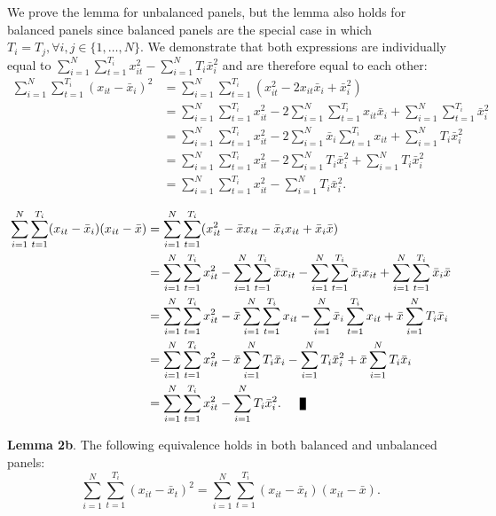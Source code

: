 \documentclass{article}[12pt]
\newenvironment{proof}[1][Proof.]{\begin{trivlist}
\item[\hskip \labelsep {\bfseries #1}]}{\end{trivlist}}
\newcommand{\qed}{\nobreak \ifvmode \relax \else
      \ifdim\lastskip<1.5em \hskip-\lastskip
      \hskip1.5em plus0em minus0.5em \fi \nobreak
      \vrule height0.75em width0.5em depth0.25em\fi}
\begin{document}
\begin{proof}
We prove the lemma for unbalanced panels, but the lemma also holds for balanced panels since balanced panels are the special case in which $T_i = T_j, \forall i, j \in \{1, \hdots, N\}$. We demonstrate that both expressions are individually equal to $\sum_{i=1}^N \sum_{t=1}^{T_i}x_{it}^2  -  \sum_{i=1}^N T_i\bar{x}_i^2$ and are therefore equal to each other:
\begin{align}
\sum_{i=1}^N \sum_{t=1}^{T_i}(x_{it}  - \bar{x}_i)^2 & = \sum_{i=1}^N \sum_{t=1}^{T_i}(x_{it}^2  - 2x_{it}\bar{x}_i + \bar{x}_i^2)\nonumber\\ 
& = \sum_{i=1}^N \sum_{t=1}^{T_i}x_{it}^2  - 2\sum_{i=1}^N \sum_{t=1}^{T_i}x_{it}\bar{x}_i + \sum_{i=1}^N \sum_{t=1}^{T_i}\bar{x}_i^2\nonumber\\ 
& = \sum_{i=1}^N \sum_{t=1}^{T_i}x_{it}^2  - 2\sum_{i=1}^N \bar{x}_i \sum_{t=1}^{T_i}x_{it}+ \sum_{i=1}^N T_i\bar{x}_i^2\nonumber\\ 
& = \sum_{i=1}^N \sum_{t=1}^{T_i}x_{it}^2  - 2\sum_{i=1}^N T_i\bar{x}_{i}^2+ \sum_{i=1}^N T_i\bar{x}_i^2\nonumber\\ 
& = \sum_{i=1}^N \sum_{t=1}^{T_i}x_{it}^2  -  \sum_{i=1}^N T_i\bar{x}_i^2.
\end{align}

\begin{align}
\sum_{i=1}^N \sum_{t=1}^{T_i}(x_{it}  - \bar{x}_i)(x_{it}  - \bar{x}) & = \sum_{i=1}^N \sum_{t=1}^{T_i}(x_{it}^2  -\bar{x}x_{it} - \bar{x}_ix_{it} + \bar{x}_i\bar{x})\nonumber\\ 
& = \sum_{i=1}^N \sum_{t=1}^{T_i} x_{it}^2  - \sum_{i=1}^N \sum_{t=1}^{T_i}\bar{x}x_{it} -  \sum_{i=1}^N \sum_{t=1}^{T_i}\bar{x}_ix_{it} +  \sum_{i=1}^N \sum_{t=1}^{T_i}\bar{x}_i\bar{x}\nonumber\\ 
& = \sum_{i=1}^N \sum_{t=1}^{T_i} x_{it}^2  - \bar{x}\sum_{i=1}^N \sum_{t=1}^{T_i}x_{it} -  \sum_{i=1}^N \bar{x}_i\sum_{t=1}^{T_i}x_{it} +  \bar{x}\sum_{i=1}^N T_i\bar{x}_i\nonumber\\ 
& = \sum_{i=1}^N \sum_{t=1}^{T_i} x_{it}^2  - \bar{x}\sum_{i=1}^N T_i\bar{x}_{i} -  \sum_{i=1}^N T_i\bar{x}_{i}^2 +  \bar{x}\sum_{i=1}^N T_i\bar{x}_i\nonumber\\ 
& = \sum_{i=1}^N \sum_{t=1}^{T_i}x_{it}^2  -  \sum_{i=1}^N T_i\bar{x}_i^2.\qed
\end{align}
\end{proof}
\textbf{Lemma 2b}. The following equivalence holds in both balanced and unbalanced panels:
\begin{equation}
\sum_{i=1}^N \sum_{t=1}^{T_i}(x_{it}  - \bar{x}_t)^2  = \sum_{i=1}^N \sum_{t=1}^{T_i}(x_{it}  - \bar{x}_t)(x_{it}  - \bar{x}).
\end{equation}
\end{document}
